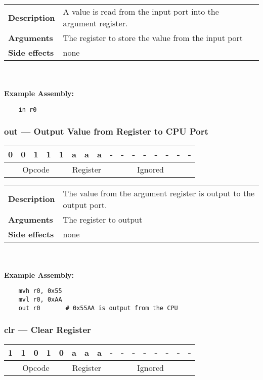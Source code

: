 \documentclass[titlepage]{article}
\begin{document}
\begin{tabular}{l p{8cm}}
{\bf Description} & A value is read from the input port into the argument register. \\
{\bf Arguments} & The register to store the value from the input port \\
{\bf Side effects} & none \\
\end{tabular}\\ \\
{\bf Example Assembly:}
\begin{verbatim}
    in r0
\end{verbatim}

\subsubsection{out --- Output Value from Register to CPU Port}\begin{center}
\begin{tabular}{|c|c|c|c|c|c|c|c|c|c|c|c|c|c|c|c|}
\hline
0 & 0 & 1 & 1 & 1 & a & a & a & - & - & - & - & - & - & - & - \\
\hline
\multicolumn{5}{|c}{Opcode} &
\multicolumn{3}{|c}{Register} &
\multicolumn{8}{|c|}{Ignored} \\
\hline
\end{tabular}
\end{center}

\begin{tabular}{l p{8cm}}
{\bf Description} & The value from the argument register is output to the output port. \\
{\bf Arguments} & The register to output \\
{\bf Side effects} & none \\
\end{tabular}\\ \\
{\bf Example Assembly:}
\begin{verbatim}
    mvh r0, 0x55
    mvl r0, 0xAA
    out r0       # 0x55AA is output from the CPU
\end{verbatim}

\subsubsection{clr --- Clear Register}\begin{center}
\begin{tabular}{|c|c|c|c|c|c|c|c|c|c|c|c|c|c|c|c|}
\hline
1 & 1 & 0 & 1 & 0 & a & a & a & - & - & - & - & - & - & - & - \\
\hline
\multicolumn{5}{|c}{Opcode} &
\multicolumn{3}{|c}{Register} &
\multicolumn{8}{|c|}{Ignored} \\
\hline
\end{tabular}
\end{center}
\end{document}

